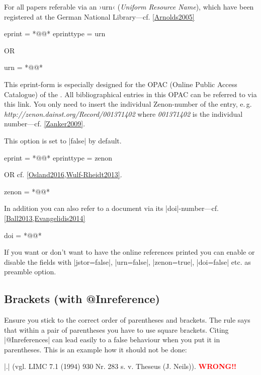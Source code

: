 \documentclass[a4paper,
10pt,
greek,
french,
spanish,
italian,
ngerman,
english
]{ltxdoc}
\begin{document}
For all papers referable via an ›urn‹ (\emph{Uniform Resource Name}), which have been registered at the German National Library---cf. \cref{Arnolds2005}
\begin{code}
eprint = *@@*
eprinttype = {urn} 
\end{code}      

OR
\begin{code}
urn = *@@*
\end{code}  

This eprint-form is especially designed for the OPAC (Online Public Access Catalogue) of the \DAI.
All bibliographical entries in this OPAC can be referred to via this link.
You only need to insert the individual Zenon-number of the entry, e.\,g. \emph{http://zenon.dainst.org/Record/001371402} where \emph{001371402} is the individual number---cf. \cref{Zanker2009}.

This option is set to |false| by default.
\begin{code}
eprint = *@@*
eprinttype = {zenon} 
\end{code}      
OR  cf. \cref{Osland2016,Wulf-Rheidt2013}.
\begin{code}
zenon = *@@*
\end{code}      


 In addition you can also refer to a document via its |doi|-number---cf. \cref{Ball2013,Evangelidis2014} 
\begin{code}
doi = *@@*
\end{code}  

If you want or don’t want to have the online references printed you can enable or disable the fields with |jstor=false|, 
|urn=false|,
|zenon=true|,
|doi=false| etc. as preamble option.

\subsection{Brackets (with @Inreference)}\label{faq:inreference}
Ensure you stick to the correct order of parentheses and brackets.
The rule says that within a pair of parentheses you have to use square brackets.
Citing |@Inreferences| can lead easily to a false behaviour when you put it in parentheses.
This is an example how it should not be done:
\begin{tcolorbox}[examplebox]
|\cite[vgl.][930 Nr. 283]{Neils1994}.| 
\tcblower
(vgl. LIMC 7.1 (1994) 930 Nr. 283 s. v. Theseus (J. Neils)). \textcolor{red}{\textbf{WRONG!!}}
\end{tcolorbox}
 
\end{document}
